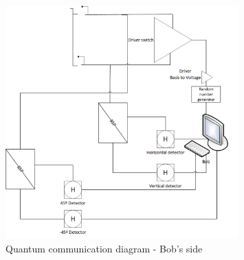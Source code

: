 \begin{figure}[H]
	\centering \includegraphics[width=0.8\textwidth,height=9cm]{./sdf/ot_with_discrete_variables/figures/OT_experimental_bob.png}
	\caption{Quantum communication diagram - Bob's side}\label{quantumchannelcommunication2}
\end{figure} 
